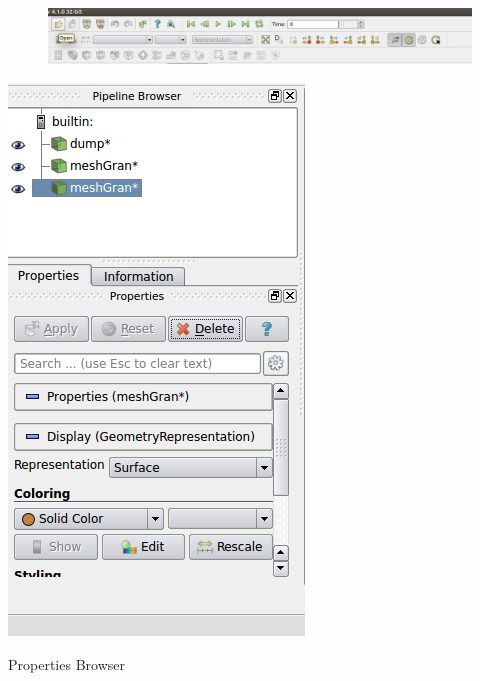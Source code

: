 \documentclass{tufte-book} %
\begin{document}
 \begin{figure}
  \includegraphics[width=\linewidth]{graphics/Screenshot/P1.png}
    \end{figure}
 \begin{marginfigure}
   \includegraphics[width=\linewidth]{graphics/Screenshot/P3.png}
   \caption{Properties Browser}
   \vspace{3ex}
 \end{marginfigure}
\end{document}
